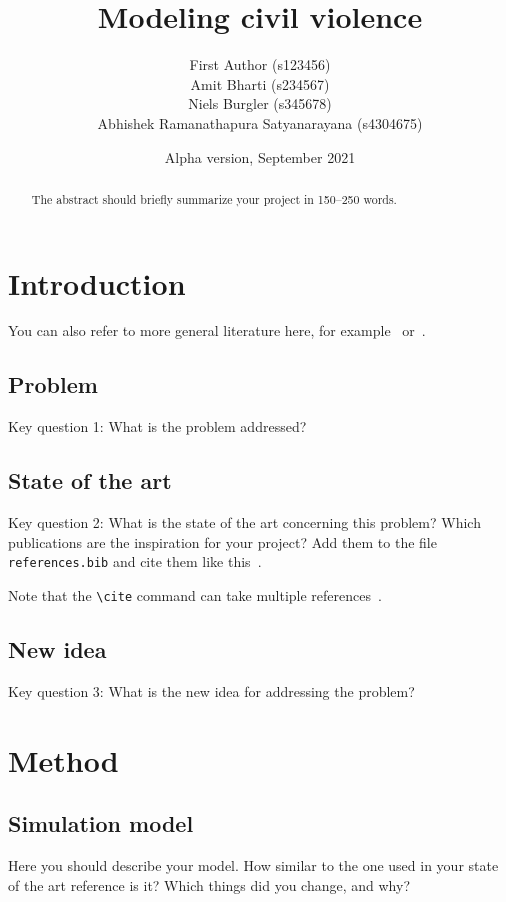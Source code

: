 \documentclass[a4paper,11pt]{article}
\title{Modeling civil violence}
\author{
  First Author (s123456)
  \\
  Amit Bharti (s234567)
  \\
  Niels Burgler (s345678)
  \\
  Abhishek Ramanathapura Satyanarayana (s4304675)
}
\date{Alpha version, September 2021} %
\begin{document}
\maketitle

\begin{abstract}
The abstract should briefly summarize your project in 150--250 words.
\end{abstract}

\section{Introduction}

You can also refer to more general literature here, for example~\cite{WooldridgeMAS} or~\cite{wiki:SchellingSegregation}.

\subsection{Problem}

Key question 1: What is the problem addressed?

\subsection{State of the art}

Key question 2: What is the state of the art concerning this problem?
Which publications are the inspiration for your project?
Add them to the file \texttt{references.bib} and cite them like this~\cite{dWVV2013:ToM}.

Note that the \verb|\cite| command can take multiple references~\cite{vDGKK2019:ReachGossip,vdBerg2019:UnreliableGossip,HvKLL2019:SupermarketQ}.

\subsection{New idea}

Key question 3: What is the new idea for addressing the problem?

\section{Method}

\subsection{Simulation model}

Here you should describe your model.
How similar to the one used in your state of the art reference is it?
Which things did you change, and why?
\end{document}
